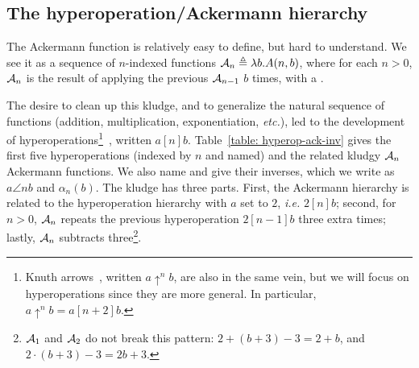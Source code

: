 \subsection{The hyperoperation/Ackermann hierarchy}

The Ackermann function is relatively easy to define, but hard to
understand.  We see it as
a sequence of $n$-indexed functions $\mathcal{A}_n \triangleq \lambda b.A(n,b)$, where for each $n>0$, $\mathcal{A}_n$ is the result of applying the previous $\mathcal{A}_{n-1}$ $b$ times, with a .

The desire to clean up this kludge, and to generalize the natural sequence
of functions (addition, multiplication, exponentiation, \emph{etc.}),
led to the development of hyperoperations\footnote{Knuth arrows~\cite{knuth}, written $a \uparrow^n b$,
are also in the same vein, but we will focus on hyperoperations
since they are more general. In particular, $a \uparrow^n b = a[n+2]b$.}~\cite{goodstein},
written $a [n] b$.
Table~\ref{table: hyperop-ack-inv} gives the first five hyperoperations
(indexed by $n$ and named) and the related kludgy $\mathcal{A}_n$ Ackermann functions.
We also name and give their inverses,
which we write as $a \angle{n} b$ and $\alpha_n(b)$.
The kludge has three parts. First, the Ackermann hierarchy is related
to the hyperoperation hierarchy with $a$ set to $2$, \emph{i.e.} $2[n]b$;
second, for $n>0$, $\mathcal{A}_n$ repeats the previous hyperoperation $2[n-1]b$
three extra times;
lastly, $\mathcal{A}_n$ subtracts three\footnote{$\mathcal{A}_{1}$ and $\mathcal{A}_{2}$ do not break this pattern: $2 + (b + 3) - 3 = 2 + b$, and $2 \cdot (b + 3) - 3 = 2b + 3$.}.

